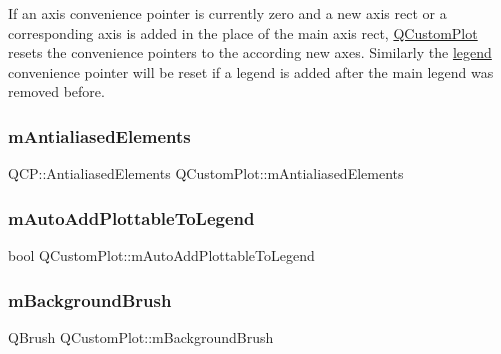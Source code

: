 If an axis convenience pointer is currently zero and a new axis rect or a corresponding axis is added in the place of the main axis rect, \mbox{\hyperlink{class_q_custom_plot}{Q\+Custom\+Plot}} resets the convenience pointers to the according new axes. Similarly the \mbox{\hyperlink{class_q_custom_plot_a4eadcd237dc6a09938b68b16877fa6af}{legend}} convenience pointer will be reset if a legend is added after the main legend was removed before. \mbox{\label{class_q_custom_plot_aa333200629256830e273873b582a5524}} 
\subsubsection{\texorpdfstring{mAntialiasedElements}{mAntialiasedElements}}
{\footnotesize\ttfamily Q\+C\+P\+::\+Antialiased\+Elements Q\+Custom\+Plot\+::m\+Antialiased\+Elements\hspace{0.3cm}{\ttfamily [protected]}}

\mbox{\label{class_q_custom_plot_aaf3ea6a4cb04d35a149cc9a0cdac3394}} 
\subsubsection{\texorpdfstring{mAutoAddPlottableToLegend}{mAutoAddPlottableToLegend}}
{\footnotesize\ttfamily bool Q\+Custom\+Plot\+::m\+Auto\+Add\+Plottable\+To\+Legend\hspace{0.3cm}{\ttfamily [protected]}}

\mbox{\label{class_q_custom_plot_a3aef5de4ac012178e3293248e9c63737}} 
\subsubsection{\texorpdfstring{mBackgroundBrush}{mBackgroundBrush}}
{\footnotesize\ttfamily Q\+Brush Q\+Custom\+Plot\+::m\+Background\+Brush\hspace{0.3cm}{\ttfamily [protected]}}

